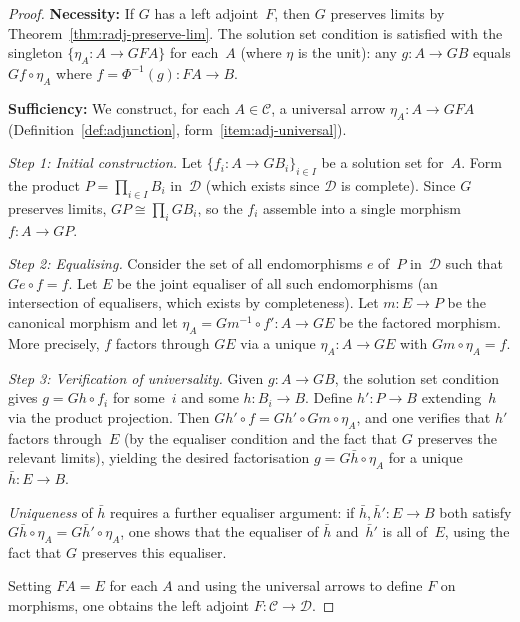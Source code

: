 \begin{proof}
\textbf{Necessity:}
If $G$ has a left adjoint~$F$, then $G$ preserves limits by
Theorem~\ref{thm:radj-preserve-lim}.
The solution set condition is satisfied with the singleton
$\{\eta_A\colon A\to GFA\}$ for each~$A$ (where $\eta$ is the unit):
any $g\colon A\to GB$ equals $Gf\circ\eta_A$ where
$f = \Phi^{-1}(g)\colon FA\to B$.

\medskip
\textbf{Sufficiency:}
We construct, for each $A\in\mathcal{C}$, a universal arrow
$\eta_A\colon A\to GFA$ (Definition~\ref{def:adjunction},
form~\ref{item:adj-universal}).

\medskip\noindent
\emph{Step 1: Initial construction.}
Let $\{f_i\colon A\to GB_i\}_{i\in I}$ be a solution set for~$A$.
Form the product $P = \prod_{i\in I} B_i$ in~$\mathcal{D}$
(which exists since $\mathcal{D}$ is complete).
Since $G$ preserves limits, $GP \cong \prod_i GB_i$,
so the $f_i$ assemble into a single morphism
$f\colon A\to GP$.

\medskip\noindent
\emph{Step 2: Equalising.}
Consider the set of all endomorphisms $e$ of~$P$ in~$\mathcal{D}$
such that $Ge\circ f = f$.  Let $E$ be the joint equaliser of all
such endomorphisms (an intersection of equalisers, which exists by
completeness).  Let $m\colon E\to P$ be the canonical morphism
and let $\eta_A = Gm^{-1}\circ f'\colon A\to GE$
be the factored morphism.  More precisely, $f$ factors through $GE$
via a unique $\eta_A\colon A\to GE$ with $Gm\circ\eta_A = f$.

\medskip\noindent
\emph{Step 3: Verification of universality.}
Given $g\colon A\to GB$, the solution set condition gives
$g = Gh\circ f_i$ for some~$i$ and some $h\colon B_i\to B$.
Define $h'\colon P\to B$ extending~$h$ via the product projection.
Then $Gh'\circ f = Gh'\circ Gm\circ\eta_A$,
and one verifies that $h'$ factors through~$E$
(by the equaliser condition and the fact that $G$ preserves the
relevant limits), yielding the desired factorisation
$g = G\bar h\circ\eta_A$ for a unique $\bar h\colon E\to B$.

\medskip\noindent
\emph{Uniqueness} of $\bar h$ requires a further equaliser argument:
if $\bar h,\bar h'\colon E\to B$ both satisfy $G\bar h\circ\eta_A
= G\bar h'\circ\eta_A$, one shows that the equaliser of $\bar h$
and~$\bar h'$ is all of~$E$, using the fact that $G$ preserves
this equaliser.

Setting $FA = E$ for each $A$ and using the universal arrows to define
$F$ on morphisms, one obtains the left adjoint
$F\colon\mathcal{C}\to\mathcal{D}$.
\end{proof}

